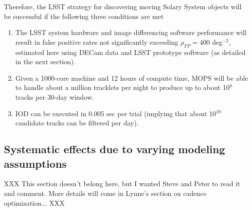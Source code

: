 Therefore, the LSST strategy for discovering moving Solary System objects will be successful
 if the following three conditions are met
\begin{enumerate}
\item The LSST system hardware and image differencing software performance will result in false positive 
          rates not significantly exceeding $\rho_{FP} =  400$ deg$^{-2}$, estimated here using DECam data
          and LSST prototype software (as detailed in the next section). 
\item Given a 1000-core machine and 12 hours of compute time, MOPS will be able to handle about 
          a million tracklets per night to produce up to about 10$^8$ tracks per 30-day window. 
\item IOD can be executed in 0.005 sec per trial (implying that about 10$^{10}$ candidate tracks can
          be filtered per day). 
\end{enumerate}





\subsection{Systematic effects due to varying modeling assumptions}

XXX This section doesn't belong here, but I wanted Steve and Peter to read it and comment. 
More details will come in Lynne's section on cadence optimization... XXX


